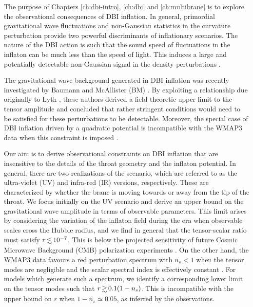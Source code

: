 The purpose of Chapters \ref{ch:dbi-intro}, \ref{ch:dbi} and \ref{ch:multibrane} is to 
explore the observational consequences of DBI inflation. 
In general, primordial gravitational wave fluctuations
and non-Gaussian statistics in the curvature perturbation provide 
two powerful discriminants of inflationary scenarios. 
The nature of the DBI action is such that the sound 
speed of fluctuations in the inflaton can be much less than the speed of 
light. This induces a large and potentially detectable non-Gaussian 
signal in the density perturbations \cite{brane6,brane11,lidser3,chenetal}. 


The gravitational wave background generated in DBI 
inflation was recently investigated by Baumann and McAllister (BM) 
\cite{bmpaper}. By exploiting a relationship due originally 
to Lyth \cite{lyth}, these authors derived a field-theoretic upper limit 
to the tensor amplitude and concluded that 
rather stringent conditions would need to be satisfied for these 
perturbations to be detectable.      
Moreover, the special case of 
DBI inflation driven by a quadratic potential is incompatible with the WMAP3 
data when this constraint is imposed \cite{bean}.  


Our aim is to derive observational constraints on DBI inflation that are 
insensitive to the details of the throat geometry and the inflaton potential. 
In general, there are two realizations of the scenario, 
which are referred to as the ultra-violet (UV) and infra-red (IR) 
versions, respectively. These are characterized by whether the brane is 
moving towards or away from the tip of the throat. 
We focus initially on the UV scenario 
and derive an upper bound on 
the gravitational wave amplitude in terms of observable 
parameters. This limit arises by considering 
the variation of the inflaton field during the era when 
observable scales cross the Hubble radius, and 
we find in general that the tensor-scalar ratio must satisfy 
$r \, \lsim \, 10^{-7}$. This 
is below the projected sensitivity of future Cosmic Microwave Background (CMB) polarization 
experiments \cite{clover,vpj}. 
On the other hand, the WMAP3 data 
favours a red perturbation spectrum with 
$n_s<1$ when the tensor modes are negligible and 
the scalar spectral index is effectively constant \cite{spergel}. 
For models which generate such a spectrum, 
we identify a corresponding lower limit on the 
tensor modes such that $r \, \gsim \, 0.1 (1-n_s)$. 
This is incompatible with the upper bound 
on $r$ when $1-n_s \simeq 0.05$, as inferred
by the observations. 


